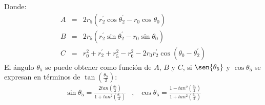 Donde:
\begin{eqnarray}
A&=& 2r_5(r^{\prime}_2\cos{\theta^{\prime}_2}-r_0\cos{\theta_0}) \label{eq:griper_A} \\
B&=& 2r_5(r^{\prime}_2\sin{\theta^{\prime}_2}-r_0\sin{\theta_0}) \label{eq:griper_B} \\
C&=& r_0^2+r^{\prime}_2+r_5^2-r_6^2 -2r_0r^{\prime}_2\cos(\theta_0-\theta^{\prime}_2) \label{eq:griper_C}
\end{eqnarray}
El ángulo $\theta_5$ se puede obtener como función de $A$, $B$ y $C$, si $\sen{\theta_5}$ y $\cos{\theta_5}$  se expresan en términos de $\tan(\frac{\theta_5}{2})$:
\begin{eqnarray}
\sin{\theta_5}= \frac{2tan(\frac{\theta_5}{2})}{1+tan^2(\frac{\theta_5}{2})}&,& \cos{\theta_5}= \frac{1-tan^2(\frac{\theta_5}{2})}{1+tan^2(\frac{\theta_5}{2})} \label{eq:griper_enFuncionTheta3}
\end{eqnarray}


